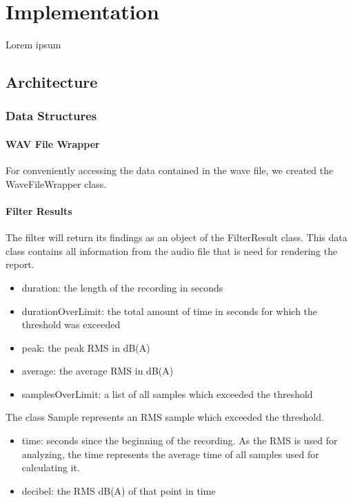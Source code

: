 \section{Implementation}
Lorem ipsum

\subsection{Architecture}

\subsubsection{Data Structures}

\paragraph{WAV File Wrapper}
For conveniently accessing the data contained in the wave file, we created the WaveFileWrapper class.

\paragraph{Filter Results}
The filter will return its findings as an object of the FilterResult class. This data class contains all information from the audio file that is need for rendering the report.

\begin{itemize}
    \item duration: the length of the recording in seconds
    \item durationOverLimit: the total amount of time in seconds for which the threshold was exceeded
    \item peak: the peak RMS in dB(A)
    \item average: the average RMS in dB(A)
    \item samplesOverLimit: a list of all samples which exceeded the threshold
\end{itemize}


The class Sample represents an RMS sample which exceeded the threshold.

\begin{itemize}
    \item time: seconds since the beginning of the recording. As the RMS is used for analyzing, the time represents the average time of all samples used for calculating it.
    \item decibel: the RMS dB(A) of that point in time
\end{itemize}

